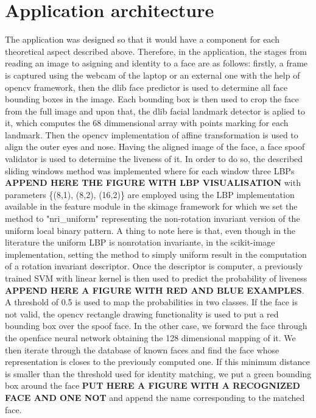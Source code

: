 \section{Application architecture}
The application was designed so that it would have a component for each theoretical aspect described above. Therefore, in the application, the stages from reading an image to asigning and identity to a face are as follows: firstly, a frame is captured using the webcam of the laptop or an external one with the help of opencv framework, then the dlib \cite{dlib09} face predictor is used to determine all face bounding boxes in the image. 
Each bounding box is then used to crop the face from the full image and upon that, the dlib facial landmark detector is aplied to it, which computes the 68 dimmensional array with points marking for each landmark. 
Then the opencv implementation of affine transformation is used to align the outer eyes and nose. Having the aligned image of the face, a face spoof validator is used to determine the liveness of it. 
In order to do so, the described sliding windows method was implemented where for each window three LBPs \textbf{APPEND HERE THE FIGURE WITH LBP VISUALISATION} with parameters \{(8,1), (8,2), (16,2)\} are employed using the LBP implementation available in the feature module in the skimage \cite{scikit-image} framework for which we set the method to "nri\_uniform" representing the non-rotation invariant version of the uniform local binary pattern. A thing to note here is that, even though in the literature the uniform LBP is nonrotation invariante, in the scikit-image \cite{scikit-image} implementation, setting the method to simply uniform result in the computation of a rotation invariant descriptor. 
Once the descriptor is computer, a previously trained SVM with linear kernel is then used to predict the probability of liveness \textbf{APPEND HERE A FIGURE WITH RED AND BLUE EXAMPLES}. A threshold of 0.5 is used to map the probabilities in two classes. If the face is not valid, the opencv rectangle drawing functionality is used to put a red bounding box over the spoof face. In the other case, we forward the face through the openface neural network obtaining the 128 dimensional mapping of it. We then iterate through the database of known faces and find the face whose representation is closes to the previously computed one. If this minimum distance is smaller than the threshold used for identity matching, we put a green bounding box around the face \textbf{PUT HERE A FIGURE WITH A RECOGNIZED FACE AND ONE NOT} and append the name corresponding to the matched face. 
